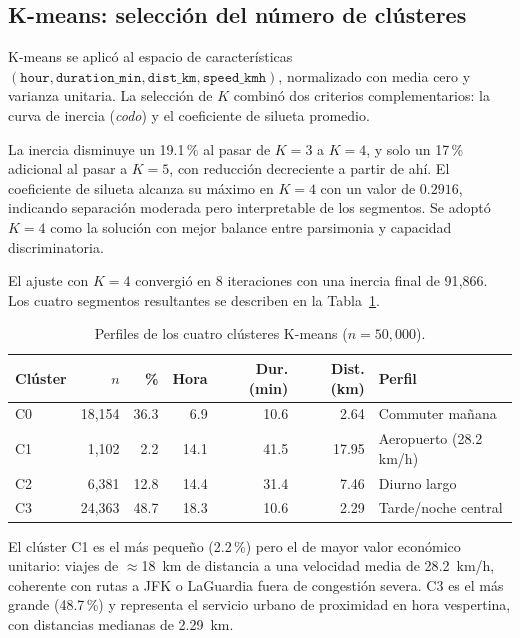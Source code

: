 \documentclass[12pt, a4paper]{article}
\begin{document}
\subsection{K-means: selección del número de clústeres}

K-means se aplicó al espacio de características $(\texttt{hour}, \texttt{duration\_min}, \texttt{dist\_km}, \texttt{speed\_kmh})$, normalizado con media cero y varianza unitaria. La selección de $K$ combinó dos criterios complementarios: la curva de inercia (\emph{codo}) y el coeficiente de silueta promedio.

La inercia disminuye un 19{.}1\,\% al pasar de $K=3$ a $K=4$, y solo un 17\,\% adicional al pasar a $K=5$, con reducción decreciente a partir de ahí. El coeficiente de silueta alcanza su máximo en $K=4$ con un valor de $0{.}2916$, indicando separación moderada pero interpretable de los segmentos. Se adoptó $K=4$ como la solución con mejor balance entre parsimonia y capacidad discriminatoria.

El ajuste con $K=4$ convergió en 8 iteraciones con una inercia final de 91{,}866. Los cuatro segmentos resultantes se describen en la Tabla~\ref{tab:kmeans}.

\begin{table}[H]
  \centering
  \caption{Perfiles de los cuatro clústeres K-means ($n=50{,}000$).}
  \label{tab:kmeans}
  \small
  \begin{tabular}{lrrrrrl}
    \toprule
    \textbf{Clúster} & \textbf{$n$} & \textbf{\%} & \textbf{Hora} & \textbf{Dur. (min)} & \textbf{Dist. (km)} & \textbf{Perfil} \\
    \midrule
    C0 & 18{,}154 & 36{.}3 & 6{.}9  & 10{.}6 & 2{.}64  & Commuter mañana \\
    C1 &  1{,}102 &  2{.}2 & 14{.}1 & 41{.}5 & 17{.}95 & Aeropuerto (28{.}2\,km/h) \\
    C2 &  6{,}381 & 12{.}8 & 14{.}4 & 31{.}4 &  7{.}46 & Diurno largo \\
    C3 & 24{,}363 & 48{.}7 & 18{.}3 & 10{.}6 &  2{.}29 & Tarde/noche central \\
    \bottomrule
  \end{tabular}
\end{table}

El clúster C1 es el más pequeño (2{.}2\,\%) pero el de mayor valor económico unitario: viajes de $\approx$18~km de distancia a una velocidad media de 28{.}2~km/h, coherente con rutas a JFK o LaGuardia fuera de congestión severa. C3 es el más grande (48{.}7\,\%) y representa el servicio urbano de proximidad en hora vespertina, con distancias medianas de 2{.}29~km.
\end{document}
